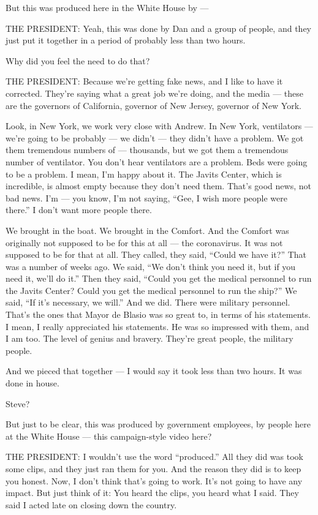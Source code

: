 But this was produced here in the White House by ---

THE PRESIDENT: Yeah, this was done by Dan and a group of people, and
they just put it together in a period of probably less than two hours.

Why did you feel the need to do that?

THE PRESIDENT: Because we're getting fake news, and I like to have it
corrected. They're saying what a great job we're doing, and the media
--- these are the governors of California, governor of New Jersey,
governor of New York.

Look, in New York, we work very close with Andrew. In New York,
ventilators --- we're going to be probably --- we didn't --- they didn't
have a problem. We got them tremendous numbers of --- thousands, but we
got them a tremendous number of ventilator. You don't hear ventilators
are a problem. Beds were going to be a problem. I mean, I'm happy about
it. The Javits Center, which is incredible, is almost empty because they
don't need them. That's good news, not bad news. I'm --- you know, I'm
not saying, ``Gee, I wish more people were there.'' I don't want more
people there.

We brought in the boat. We brought in the Comfort. And the Comfort was
originally not supposed to be for this at all --- the coronavirus. It
was not supposed to be for that at all. They called, they said, ``Could
we have it?'' That was a number of weeks ago. We said, ``We don't think
you need it, but if you need it, we'll do it.'' Then they said, ``Could
you get the medical personnel to run the Javits Center? Could you get
the medical personnel to run the ship?'' We said, ``If it's necessary,
we will.'' And we did. There were military personnel. That's the ones
that Mayor de Blasio was so great to, in terms of his statements. I
mean, I really appreciated his statements. He was so impressed with
them, and I am too. The level of genius and bravery. They're great
people, the military people.

And we pieced that together --- I would say it took less than two hours.
It was done in house.

Steve?

But just to be clear, this was produced by government employees, by
people here at the White House --- this campaign-style video here?

THE PRESIDENT: I wouldn't use the word ``produced.'' All they did was
took some clips, and they just ran them for you. And the reason they did
is to keep you honest. Now, I don't think that's going to work. It's not
going to have any impact. But just think of it: You heard the clips, you
heard what I said. They said I acted late on closing down the country.

